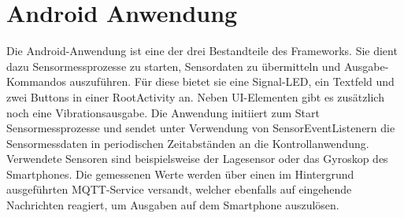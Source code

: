 \documentclass[11pt,a4paper]{report}
\begin{document}
\chapter{Android Anwendung}\label{chap:app}
Die Android-Anwendung ist eine der drei Bestandteile des Frameworks.
Sie dient dazu Sensormessprozesse zu starten, Sensordaten zu übermitteln und Ausgabe-Kommandos auszuführen.
Für diese bietet sie eine Signal-LED, ein Textfeld und zwei Buttons in einer RootActivity an.
Neben UI-Elementen gibt es zusätzlich noch eine Vibrationsausgabe. 
Die Anwendung initiiert zum Start Sensormessprozesse und sendet unter Verwendung von SensorEventListenern die Sensormessdaten in periodischen Zeitabständen an die Kontrollanwendung.
Verwendete Sensoren sind beispielsweise der Lagesensor oder das Gyroskop des Smartphones.
Die gemessenen Werte werden über einen im Hintergrund ausgeführten MQTT-Service versandt, welcher ebenfalls auf eingehende Nachrichten reagiert, um Ausgaben auf dem Smartphone auszulösen.
\end{document}
